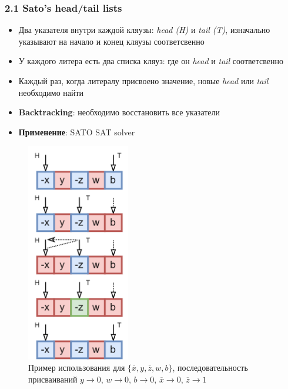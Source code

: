 \documentclass[aspectratio=169,xcolor=table,english]{beamer}
\begin{document}
\begin{frame}[fragile] \frametitle{2.1 Sato’s head/tail lists}
    \begin{minipage}[m]{0.55\linewidth}
        \begin{itemize}
            \item Два указателя внутри каждой кляузы: \textit{head (H)} и \textit{tail (T)}, изначально указывают на начало и конец кляузы соответсвенно
            \item У каждого литера есть два списка кляуз: где он \textit{head} и \textit{tail} соответсвенно
            \item Каждый раз, когда литералу присвоено значение, новые \textit{head} или \textit{tail} необходимо найти
            \item \textbf{Backtracking}: необходимо восстановить все указатели
            \item \textbf{Применение}: SATO SAT solver
        \end{itemize}
    \end{minipage}\hfill
    \begin{minipage}[m]{0.4\linewidth}
        \begin{figure}
            \centering
            \includegraphics[width=0.4\textwidth]{figures/head tail.png}
            \caption{Пример использования для $\{\overline{x},y,\overline{z},w,b\}$, последовательность присваиваний $y \rightarrow 0$, $w \rightarrow 0$, $b \rightarrow 0$, $\overline{x} \rightarrow 0$, $\overline{z} \rightarrow 1$}
        \end{figure}
    \end{minipage}
\end{frame}
\end{document}
